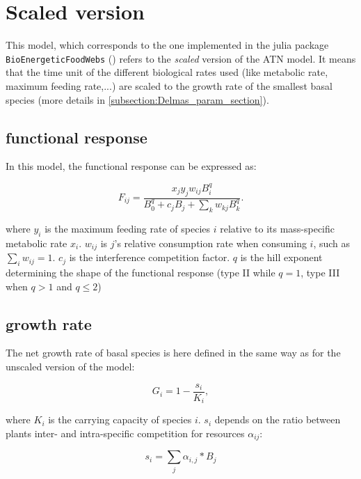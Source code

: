 \documentclass[12pt,a4paper]{article}
\begin{document}
\section{Scaled version}
\label{section:delmas}

This model, which corresponds to the one implemented in the julia package \texttt{BioEnergeticFoodWebs} (\cite{delmas2017simulations}) refers to the \textit{scaled} version of the ATN model. It means that the time unit of the different biological rates used (like metabolic rate, maximum feeding rate,...) are scaled to the growth rate of the smallest basal species (more details in \ref{subsection:Delmas_param_section}).   

\subsection{functional response}

In this model, the functional response can be expressed as: 

\begin{equation}
F_{ij} = \frac{x_jy_jw_{ij}B_i^q}{B_0^q + c_jB_j + \sum_kw_{kj}B_k^q}.
\end{equation}

where $y_i$ is the maximum feeding rate of species $i$ relative to its mass-specific metabolic rate $x_i$. $w_{ij}$ is $j$'s relative consumption rate when consuming $i$, such as $\sum_iw_{ij} = 1$. $c_j$ is the interference competition factor. $q$ is the hill exponent determining the shape of the functional response (type II while $q = 1$, type III when $q > 1$ and $q\leq2$)

\subsection{growth rate}

The net growth rate of basal species is here defined in the same way as for the unscaled version of the model:

\begin{equation}
G_i = 1 - \frac{s_i}{K_i},
\end{equation}

where $K_i$ is the carrying capacity of species $i$. $s_i$ depends on the ratio between plants inter- and intra-specific competition for resources $\alpha_{ij}$:

\begin{equation}
s_i = \sum_j \alpha_{i,j}*B_j
\end{equation}
\end{document}
